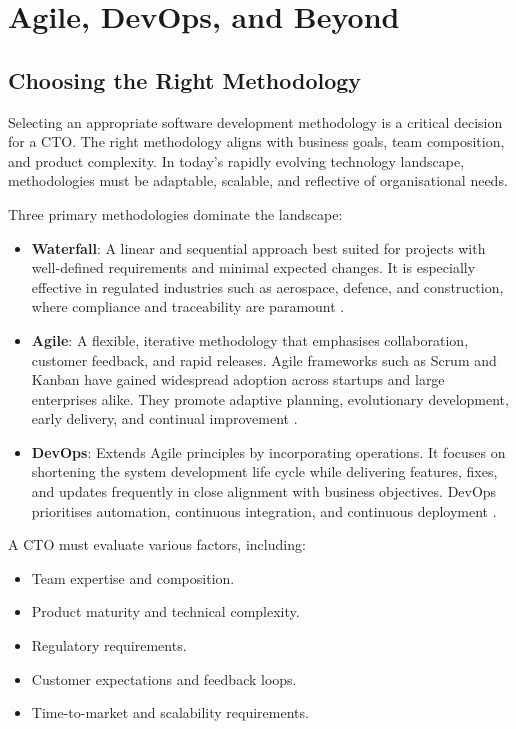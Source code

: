 \section{Agile, DevOps, and Beyond}

\subsection{Choosing the Right Methodology}
Selecting an appropriate software development methodology is a critical decision for a CTO. The right methodology aligns with business goals, team composition, and product complexity. In today's rapidly evolving technology landscape, methodologies must be adaptable, scalable, and reflective of organisational needs.

Three primary methodologies dominate the landscape:

\begin{itemize}
    \item \textbf{Waterfall}: A linear and sequential approach best suited for projects with well-defined requirements and minimal expected changes. It is especially effective in regulated industries such as aerospace, defence, and construction, where compliance and traceability are paramount \cite{royce1970waterfall}.

    \item \textbf{Agile}: A flexible, iterative methodology that emphasises collaboration, customer feedback, and rapid releases. Agile frameworks such as Scrum and Kanban have gained widespread adoption across startups and large enterprises alike. They promote adaptive planning, evolutionary development, early delivery, and continual improvement \cite{beck2001agile}.

    \item \textbf{DevOps}: Extends Agile principles by incorporating operations. It focuses on shortening the system development life cycle while delivering features, fixes, and updates frequently in close alignment with business objectives. DevOps prioritises automation, continuous integration, and continuous deployment \cite{kim2016phoenix}.
\end{itemize}

A CTO must evaluate various factors, including:
\begin{itemize}
    \item Team expertise and composition.
    \item Product maturity and technical complexity.
    \item Regulatory requirements.
    \item Customer expectations and feedback loops.
    \item Time-to-market and scalability requirements.
\end{itemize}

